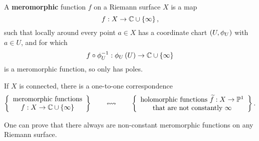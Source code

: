 A \textbf{meromorphic} function $ f $ on a Riemann surface $ X $ is a map
$$ f : X \to \mathbb{C} \cup \left\{ \infty \right\}, $$
such that locally around every point $ a \in X $ has a coordinate chart $ \left( U, \phi_U \right) $ with $ a \in U $, and for which
$$ f \circ \phi_U^{-1} : \phi_U\left( U \right) \to \mathbb{C} \cup \left\{ \infty \right\} $$
is a meromorphic function, so only has poles.

\begin{lemma}
If $ X $ is connected, there is a one-to-one correspondence
$$ \correspondence{\text{meromorphic functions} \\ f : X \to \C \cup \cb{\infty}}{\text{holomorphic functions} \ \widetilde{f} : X \to \P^1 \\ \text{that are not constantly} \ \infty}. $$
\end{lemma}

\begin{fact*}
One can prove that there always are non-constant meromorphic functions on any Riemann surface.
\end{fact*}

